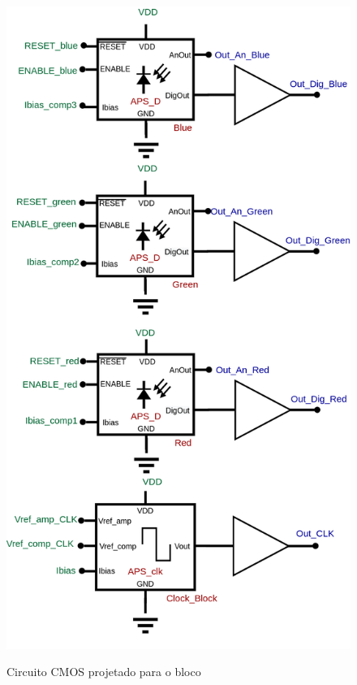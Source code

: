 \begin{figure}[htb]
 \centering
    \centering
    \caption{Circuito CMOS projetado para o bloco \NomeBloco} 
    \includegraphics[scale=0.3]{Circuitos/APS_3.png}
    \label{\NomePFig}
\end{figure}

